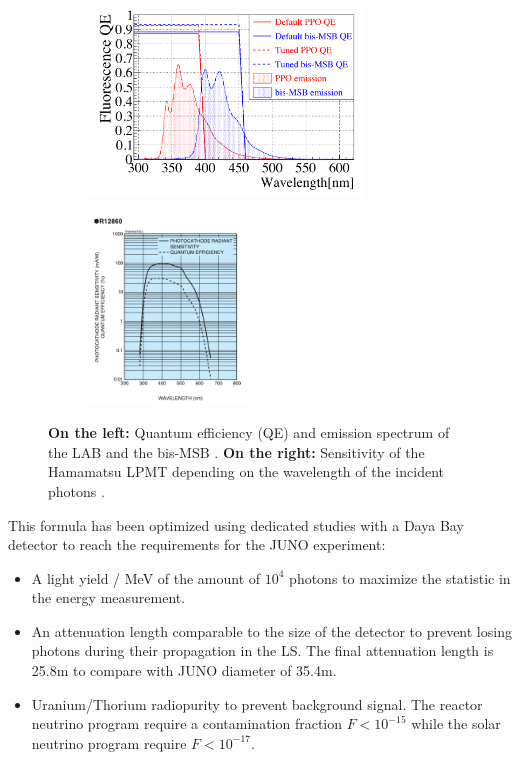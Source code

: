 \begin{figure}[ht]
  \centering
  \begin{subfigure}[b]{0.48\textwidth}
    \centering
    \includegraphics[height=5cm]{images/juno/LS_spectrum.png}
  \end{subfigure}
  \hfill
  \begin{subfigure}[b]{0.48\textwidth}
    \centering
    \includegraphics[height=5cm]{images/juno/LPMT_efficiency.png}
  \end{subfigure}
  \caption{\textbf{On the left:} Quantum efficiency (QE) and emission spectrum of the LAB and the bis-MSB \cite{bay_optimization_2020}. \textbf{On the right:} Sensitivity of the Hamamatsu LPMT depending on the wavelength of the incident photons \cite{noauthor_photomultiplier_nodate}.}
  \label{fig:LS_spectrum_and_PMT_sensitivity}
\end{figure}

This formula has been optimized using dedicated studies with a Daya Bay detector \cite{bay_optimization_2020, zhang_complete_2020} to reach the requirements for the JUNO experiment:
\begin{itemize}
  \item A light yield / MeV of the amount of $10^4$ photons to maximize the statistic in the energy measurement.
  \item An attenuation length comparable to the size of the detector to prevent losing photons during their propagation in the LS. The final attenuation length is 25.8m \cite{yang_light_2017} to compare with JUNO diameter of 35.4m.
  \item Uranium/Thorium radiopurity to prevent background signal. The reactor neutrino program require a contamination fraction $F<10^{-15}$ while the solar neutrino program require $F<10^{-17}$.
\end{itemize}

